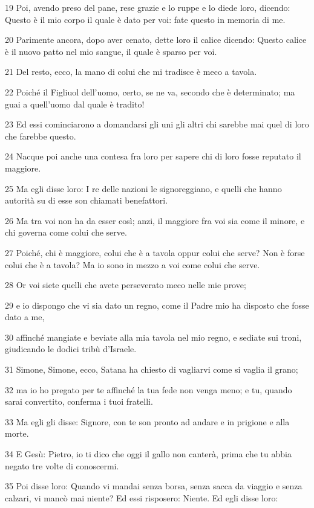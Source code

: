 \par 19 Poi, avendo preso del pane, rese grazie e lo ruppe e lo diede loro, dicendo: Questo è il mio corpo il quale è dato per voi: fate questo in memoria di me.
\par 20 Parimente ancora, dopo aver cenato, dette loro il calice dicendo: Questo calice è il nuovo patto nel mio sangue, il quale è sparso per voi.
\par 21 Del resto, ecco, la mano di colui che mi tradisce è meco a tavola.
\par 22 Poiché il Figliuol dell'uomo, certo, se ne va, secondo che è determinato; ma guai a quell'uomo dal quale è tradito!
\par 23 Ed essi cominciarono a domandarsi gli uni gli altri chi sarebbe mai quel di loro che farebbe questo.
\par 24 Nacque poi anche una contesa fra loro per sapere chi di loro fosse reputato il maggiore.
\par 25 Ma egli disse loro: I re delle nazioni le signoreggiano, e quelli che hanno autorità su di esse son chiamati benefattori.
\par 26 Ma tra voi non ha da esser così; anzi, il maggiore fra voi sia come il minore, e chi governa come colui che serve.
\par 27 Poiché, chi è maggiore, colui che è a tavola oppur colui che serve? Non è forse colui che è a tavola? Ma io sono in mezzo a voi come colui che serve.
\par 28 Or voi siete quelli che avete perseverato meco nelle mie prove;
\par 29 e io dispongo che vi sia dato un regno, come il Padre mio ha disposto che fosse dato a me,
\par 30 affinché mangiate e beviate alla mia tavola nel mio regno, e sediate sui troni, giudicando le dodici tribù d'Israele.
\par 31 Simone, Simone, ecco, Satana ha chiesto di vagliarvi come si vaglia il grano;
\par 32 ma io ho pregato per te affinché la tua fede non venga meno; e tu, quando sarai convertito, conferma i tuoi fratelli.
\par 33 Ma egli gli disse: Signore, con te son pronto ad andare e in prigione e alla morte.
\par 34 E Gesù: Pietro, io ti dico che oggi il gallo non canterà, prima che tu abbia negato tre volte di conoscermi.
\par 35 Poi disse loro: Quando vi mandai senza borsa, senza sacca da viaggio e senza calzari, vi mancò mai niente? Ed essi risposero: Niente. Ed egli disse loro:
